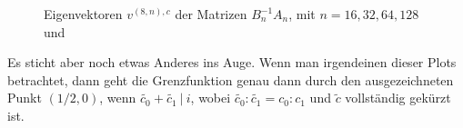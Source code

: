 \begin{figure}[H]
  \centering
  \hspace{0mm}
  \hspace{0mm}
  \caption{Eigenvektoren $v^{(8, n), c}$ der Matrizen $B_n^{-1} A_n$, mit $n = 16, 32, 64, 128$ und}
  \label{fig:Eigenvektoren_general_vertauscht}
\end{figure}

Es sticht aber noch etwas Anderes ins Auge. Wenn man irgendeinen dieser Plots betrachtet, dann geht die Grenzfunktion genau dann durch den ausgezeichneten Punkt $(1/2, 0)$, wenn $\tilde{c_0} + \tilde{c_1} \: | \: i$, wobei $\tilde{c_0} : \tilde{c_1} = c_0 : c_1$ und $\tilde{c}$ vollständig gekürzt ist. \\

